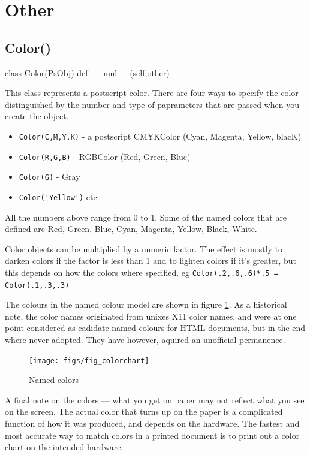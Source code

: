 \documentclass[a4paper]{book}
\begin{document}
\section{Other}

\subsection{Color()}
\label{sec:color}
\begin{python}
class Color(PsObj)
    def __mul__(self,other)
\end{python}

This class represents a postscript color. There are four ways to specify
the color distinguished by the number and type of paprameters that
are passed when you create the object.

\begin{itemize}
\item \Verb|Color(C,M,Y,K)| - a postscript CMYKColor (Cyan, Magenta, Yellow, blacK) 
\item \Verb|Color(R,G,B)| - RGBColor (Red, Green, Blue)
\item \Verb|Color(G)| - Gray
\item \Verb|Color('Yellow')| etc
\end{itemize}

All the numbers above range from 0 to 1. Some of the named colors that
are defined are Red, Green, Blue, Cyan, Magenta, Yellow, Black, White.

Color objects can be multiplied by a numeric factor.  The effect is
mostly to darken colors if the factor is less than 1 and to lighten
colors if it's greater, but this depends on how the colors where
specified.  eg \Verb|Color(.2,.6,.6)*.5 = Color(.1,.3,.3)|

The colours in the named colour model are shown in figure
\ref{fig:colourchart}. As a historical note, the color names originated 
from unixes X11 color names, and were at one point considered as 
cadidate named colours for HTML documents, but in the end where
never adopted. They have however, aquired an unofficial permanence.
\begin{figure}[h]
\centerline{
  \texttt{[image: figs/fig\_colorchart]}
}
\caption{Named colors}
\label{fig:colourchart}
\end{figure}

A final note on the colors --- what you get on paper may not reflect
what you see on the screen. The actual color that turns up on the
paper is a complicated function of how it was produced, and depends on
the hardware. The fastest and most accurate way to match colors in a
printed document is to print out a color chart on the intended
hardware.
\end{document}
